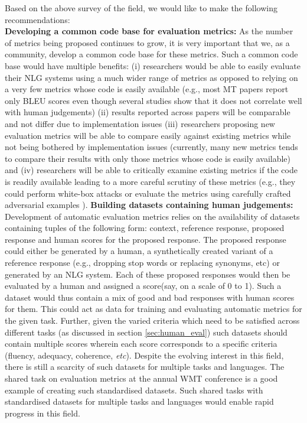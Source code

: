 Based on the above survey of the field, we would like to make the following recommendations: \\
\noindent \textbf{Developing a common code base for evaluation metrics:} As the number of metrics being proposed continues to grow, it is very important that we, as a community, develop a common code base for these metrics. Such a common code base would have multiple benefits: (i) researchers would be able to easily evaluate their NLG systems using a much wider range of metrics as opposed to relying on a very few metrics whose code is easily available (e.g., most MT papers report only BLEU scores even though several studies show that it does not correlate well with human judgements) (ii) results reported across papers will be comparable and not differ due to implementation issues (iii) researchers proposing new evaluation metrics will be able to compare easily against existing metrics while not being bothered by implementation issues (currently, many new metrics tends to compare their results with only those metrics whose code is easily available) and (iv) researchers will be able to critically examine existing metrics if the code is readily available leading to a more careful scrutiny of these metrics (e.g., they could perform white-box attacks or evaluate the metrics using carefully crafted adversarial examples ).
\noindent \textbf{Building datasets containing human judgements:} Development of automatic evaluation metrics relies on the availability of datasets containing tuples of the following form: context, reference response, proposed response and human scores for the proposed response. The proposed response could either be generated by a human, a synthetically created variant of a reference response (e.g., dropping stop words or replacing synonyms, etc) or generated by an NLG system. Each of these proposed responses would then be evaluated by a human and assigned a score(say, on a scale of 0 to 1). Such a dataset would thus contain a mix of good and bad responses with human scores for them. This could act as data for training and evaluating automatic metrics for the given task. Further, given the varied criteria which need to be satisfied across different tasks (as discussed in section \ref{sec:human_eval}) such datasets should contain multiple scores wherein each score corresponds to a specific criteria (fluency, adequacy, coherence, \textit{etc}). Despite the evolving interest in this field, there is still a scarcity of such datasets for multiple tasks and languages. The shared task on evaluation metrics at the annual WMT conference  is a good example of creating such standardised datasets. Such shared tasks with standardised datasets for multiple tasks and languages would enable rapid progress in this field.
